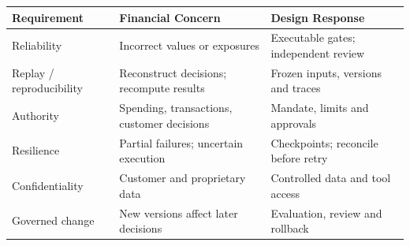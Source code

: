 \begin{tabular}{@{}P{2.8cm}P{4.7cm}P{5.1cm}@{}}
\toprule
\textbf{Requirement} & \textbf{Financial Concern} & \textbf{Design Response} \\
\midrule
Reliability & Incorrect values or exposures & Executable gates; independent review \\
Replay / reproducibility & Reconstruct decisions; recompute results & Frozen inputs, versions and traces \\
Authority & Spending, transactions, customer decisions & Mandate, limits and approvals \\
Resilience & Partial failures; uncertain execution & Checkpoints; reconcile before retry \\
Confidentiality & Customer and proprietary data & Controlled data and tool access \\
Governed change & New versions affect later decisions & Evaluation, review and rollback \\
\bottomrule
\end{tabular}
